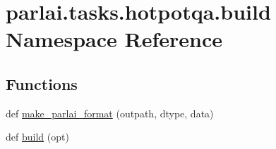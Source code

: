 \hypertarget{namespaceparlai_1_1tasks_1_1hotpotqa_1_1build}{}\section{parlai.\+tasks.\+hotpotqa.\+build Namespace Reference}
\label{namespaceparlai_1_1tasks_1_1hotpotqa_1_1build}
\subsection*{Functions}
\begin{DoxyCompactItemize}
\item 
def \hyperlink{namespaceparlai_1_1tasks_1_1hotpotqa_1_1build_a11cd6bdcce0c267fa7bebb496d930b44}{make\+\_\+parlai\+\_\+format} (outpath, dtype, data)
\item 
def \hyperlink{namespaceparlai_1_1tasks_1_1hotpotqa_1_1build_a98853aa474b04fb50fa49cec3f1c3882}{build} (opt)
\end{DoxyCompactItemize}
